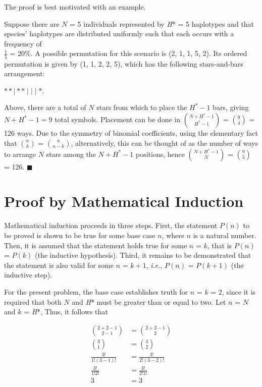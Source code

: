 \vspace{5mm}

The proof is best motivated with an example.

\vspace{5mm}

Suppose there are $N$ = 5 individuals represented by \textit{H}* = 5 haplotypes and that species' haplotypes are distributed uniformly such that each occurs with a frequency of \\ $\frac{1}{5}$ = 20\%. A possible permutation for this scenario is (2, 1, 1, 5, 2). Its ordered permutation is given by (1, 1, 2, 2, 5), which has the following stars-and-bars arrangement:

\begin{center}
$* * \mid * * \mid \mid \mid *$.
\end{center}

\noindent Above, there are a total of $N$ stars from which to place the $H^* - 1$ bars, giving $N + H^* - 1 = 9$ total symbols. Placement can be done in ${N + H^* - 1}\choose{H^* - 1}$ = ${9}\choose{4}$ = 126 ways. Due to the symmetry of binomial coefficients, using the elementary fact that ${n}\choose{k}$ = ${n}\choose{n-k}$, alternatively, this can be thought of as the number of ways to arrange $N$ stars among the $N + H^* - 1$ positions, hence ${N + H^* - 1}\choose{N}$ = ${9}\choose{5}$ = 126. $\blacksquare$ 

\section{Proof by Mathematical Induction}

Mathematical induction proceeds in three steps. First, the statement $P(n)$ to be proved is shown to be true for some base case $n$, where $n$ is a natural number. Then, it is assumed that the statement holds true for some $n$ = $k$, that is $P(n)$ = $P(k)$ (the inductive hypothesis). Third, it remains to be demonstrated that the statement is also valid for some $n$ = $k+1$, \textit{i.e.}, $P(n)$ = $P(k+1)$ (the inductive step).

\vspace{5mm}

For the present problem, the base case establishes truth for $n$ = $k$ = 2, since it is required that both $N$ and \textit{H}* must be greater than or equal to two. Let $n$ = $N$ and $k$ = \textit{H}*, Thus, it follows that

\begin{align*}
\binom{2 + 2 - 1}{2 - 1} &= \binom{2 + 2 - 1}{2} \\
\binom{3}{1} &= \binom{3}{2} \\
\frac{3!}{1!(3-1)!} &= \frac{3!}{2!(3-2)!} \\
\frac{3!}{1!2!} &= \frac{3!}{2!1!} \\
3 &= 3
\end{align*}

